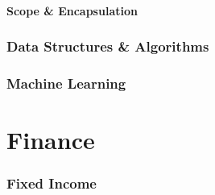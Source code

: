 \documentclass[10pt,a4paper,fleqn]{article} %
\begin{document}
\subsection{Scope \& Encapsulation} %


\section{Data Structures \& Algorithms} %

\section{Machine Learning} %

\newpage

\part {Finance}

\section{Fixed Income} %
\end{document}
